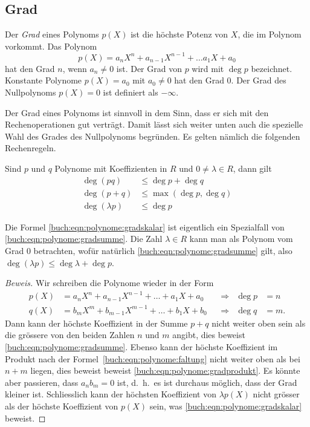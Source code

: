 %
%
\subsection{Grad
\label{buch:subsection:polynome:grad}}

\begin{definition}
Der {\em Grad} eines Polynoms $p(X)$ ist die höchste Potenz von $X$, die im
Polynom vorkommt.
Das Polynom
\[
p(X) = a_nX^n + a_{n-1}X^{n-1}+\dots a_1X + a_0
\]
hat den Grad $n$, wenn $a_n\ne 0$ ist.
Der Grad von $p$ wird mit $\deg p$ bezeichnet.
Konstante Polynome $p(X)=a_0$ mit $a_0\ne 0$ hat den Grad $0$.
Der Grad des Nullpolynoms $p(X)=0$ ist definiert als
$-\infty$.
\end{definition}

Der Grad eines Polynoms ist sinnvoll in dem Sinn, dass er sich mit
den Rechenoperationen gut verträgt.
Damit lässt sich weiter unten auch die spezielle Wahl des Grades
des Nullpolynoms begründen.
Es gelten nämlich die folgenden Rechenregeln.

\begin{lemma}
\label{lemma:rechenregelnfuerpolynomgrad}
Sind $p$ und $q$ Polynome mit Koeffizienten in $R$ und $0\ne \lambda\in R$,
dann gilt
\begin{align}
\deg(pq) &\le \deg p + \deg q
\label{buch:eqn:polynome:gradsumme}
\\
\deg(p+q) &\le \max(\deg p, \deg q)
\label{buch:eqn:polynome:gradprodukt}
\\
\deg(\lambda p) &\le \deg p
\label{buch:eqn:polynome:gradskalar}
\end{align}
\end{lemma}

Die Formel \eqref{buch:eqn:polynome:gradskalar} ist eigentlich
ein Spezialfall von \eqref{buch:eqn:polynome:gradsumme}.
Die Zahl $\lambda\in R$ kann man als Polynom vom Grad $0$ betrachten,
wofür natürlich \eqref{buch:eqn:polynome:gradsumme} gilt, also
$\deg(\lambda p) \le \deg\lambda + \deg p$.

\begin{proof}[Beweis]
Wir schreiben die Polynome wieder in der Form
\begin{align*}
p(X) &= a_nX^n + a_{n-1}X^{n-1} + \dots + a_1X + a_0&&\Rightarrow&\deg p&=n\\
q(X) &= b_mX^m + b_{m-1}X^{m-1} + \dots + b_1X + b_0&&\Rightarrow&\deg q&=m.
\end{align*}
Dann kann der höchste Koeffizient in der Summe $p+q$ nicht weiter oben
sein als die grössere von den beiden Zahlen $n$ und $m$ angibt, dies
beweist \eqref{buch:eqn:polynome:gradsumme}.
Ebenso kann der höchste Koeffizient im Produkt nach der
Formel~\eqref{buch:eqn:polynome:faltung} nicht weiter oben als bei
$n+m$ liegen, dies beweist
beweist \eqref{buch:eqn:polynome:gradprodukt}.
Es könnte aber passieren, dass $a_nb_m=0$ ist, d.~h.~es ist durchaus möglich,
dass der Grad kleiner ist.
Schliesslich kann der höchsten Koeffizient von $\lambda p(X)$ nicht grösser
als der höchste Koeffizient von $p(X)$ sein, was 
\eqref{buch:eqn:polynome:gradskalar} beweist.
\end{proof}

